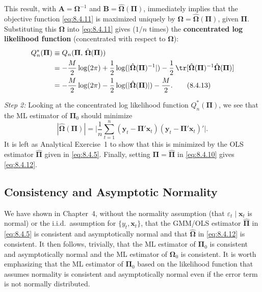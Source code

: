 This result, with $\mathbf{A} = \boldsymbol{\Omega}^{-1}$ and
$\mathbf{B} = \hat{\boldsymbol{\Omega}}(\boldsymbol{\Pi})$, immediately implies that the
objective function \eqref{eq:8.4.11} is maximized uniquely by
$\boldsymbol{\Omega} = \hat{\boldsymbol{\Omega}}(\boldsymbol{\Pi})$, given $\boldsymbol{\Pi}$.
Substituting this $\boldsymbol{\Omega}$ into \eqref{eq:8.4.11} gives ($1/n$ times) the \textbf{concentrated
log likelihood function} (concentrated with respect to $\boldsymbol{\Omega}$):
\begin{align}
  Q_n^*(\boldsymbol{\Pi})
  &\equiv Q_n(\boldsymbol{\Pi},\, \hat{\boldsymbol{\Omega}}(\boldsymbol{\Pi})) \notag \\
  &= -\frac{M}{2}\log(2\pi)
     + \frac{1}{2}\log(|\hat{\boldsymbol{\Omega}}(\boldsymbol{\Pi})^{-1}|)
     - \frac{1}{2}\,\tr[\hat{\boldsymbol{\Omega}}(\boldsymbol{\Pi})^{-1}
       \hat{\boldsymbol{\Omega}}(\boldsymbol{\Pi})] \notag \\
  &= -\frac{M}{2}\log(2\pi)
     - \frac{1}{2}\log(|\hat{\boldsymbol{\Omega}}(\boldsymbol{\Pi})|)
     - \frac{M}{2}.
  \label{eq:8.4.13} \tag{8.4.13}
\end{align}

\medskip
\noindent\textit{Step 2:}\quad
Looking at the concentrated log likelihood function $Q_n^*(\boldsymbol{\Pi})$, we see that
the ML estimator of $\boldsymbol{\Pi}_0$ should minimize
\begin{equation}
  |\hat{\boldsymbol{\Omega}}(\boldsymbol{\Pi})|
  = \biggl|\frac{1}{n}\sum_{t=1}^{n}
    (\mathbf{y}_t - \boldsymbol{\Pi}'\mathbf{x}_t)
    (\mathbf{y}_t - \boldsymbol{\Pi}'\mathbf{x}_t)'\biggr|.
  \label{eq:8.4.14} \tag{8.4.14}
\end{equation}
It is left as Analytical Exercise~1 to show that this is minimized by the
OLS estimator $\hat{\boldsymbol{\Pi}}$ given in \eqref{eq:8.4.5}. Finally, setting
$\boldsymbol{\Pi} = \hat{\boldsymbol{\Pi}}$ in \eqref{eq:8.4.10}
gives \eqref{eq:8.4.12}.

\subsection*{Consistency and Asymptotic Normality}

We have shown in Chapter~4, without the normality assumption (that $\varepsilon_t \mid \mathbf{x}_t$ is
normal) or the i.i.d.\ assumption for $\{y_t, \mathbf{x}_t\}$, that the GMM/OLS estimator
$\hat{\boldsymbol{\Pi}}$ in \eqref{eq:8.4.5} is consistent and asymptotically normal and that $\hat{\boldsymbol{\Omega}}$ in
\eqref{eq:8.4.12} is consistent.
It then follows, trivially, that the ML estimator of $\boldsymbol{\Pi}_0$ is consistent and asymptotically normal and the ML estimator of $\boldsymbol{\Omega}_0$ is consistent. It is worth emphasizing
that the ML estimator of $\boldsymbol{\Pi}_0$ based on the likelihood function that assumes normality is consistent and asymptotically normal even if the error term is not normally
distributed.

